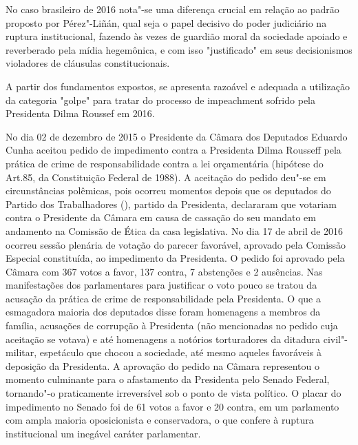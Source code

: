 No caso brasileiro de 2016 nota"-se uma diferença crucial em relação ao
padrão proposto por Pérez"-Liñán, qual seja o papel decisivo do poder
judiciário na ruptura institucional, fazendo às vezes de guardião moral
da sociedade apoiado e reverberado pela mídia hegemônica, e com isso
"justificado" em seus decisionismos violadores de cláusulas
constitucionais.

A partir dos fundamentos expostos, se apresenta razoável e adequada a
utilização da categoria "golpe" para tratar do processo de impeachment
sofrido pela Presidenta Dilma Roussef em 2016.

No dia 02 de dezembro de 2015 o Presidente da Câmara dos Deputados
Eduardo Cunha aceitou pedido de impedimento contra a Presidenta Dilma
Rousseff pela prática de crime de responsabilidade contra a lei
orçamentária (hipótese do Art.85,  da Constituição Federal de 1988). A
aceitação do pedido deu"-se em circunstâncias polêmicas, pois ocorreu
momentos depois que os deputados do Partido dos Trabalhadores (),
partido da Presidenta, declararam que votariam contra o Presidente da
Câmara em causa de cassação do seu mandato em andamento na Comissão de
Ética da casa legislativa. No dia 17 de abril de 2016 ocorreu sessão
plenária de votação do parecer favorável, aprovado pela Comissão
Especial constituída, ao impedimento da Presidenta. O pedido foi
aprovado pela Câmara com 367 votos a favor, 137 contra, 7 abstenções e 2
ausências. Nas manifestações dos parlamentares para justificar o voto
pouco se tratou da acusação da prática de crime de responsabilidade pela
Presidenta. O que a esmagadora maioria dos deputados disse foram
homenagens a membros da família, acusações de corrupção à Presidenta
(não mencionadas no pedido cuja aceitação se votava) e até homenagens a
notórios torturadores da ditadura civil"-militar, espetáculo que chocou a
sociedade, até mesmo aqueles favoráveis à deposição da Presidenta. A
aprovação do pedido na Câmara representou o momento culminante para o
afastamento da Presidenta pelo Senado Federal, tornando"-o praticamente
irreversível sob o ponto de vista político. O placar do impedimento no
Senado foi de 61 votos a favor e 20 contra, em um parlamento com ampla
maioria oposicionista e conservadora, o que confere à ruptura
institucional um inegável caráter parlamentar.

